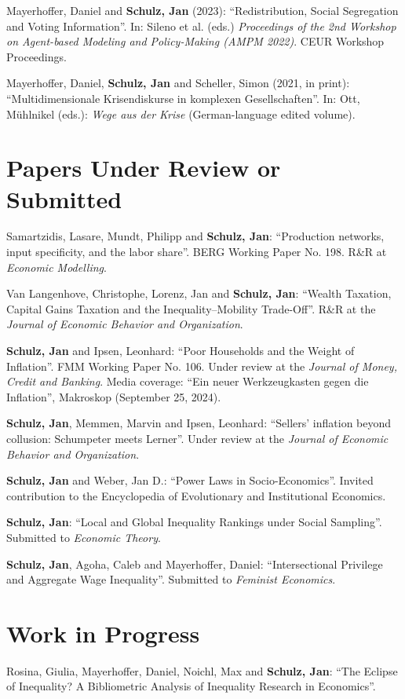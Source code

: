 \documentclass[margin]{res}
\begin{document}
\begin{resume}
	Mayerhoffer, Daniel and \textbf{Schulz, Jan} (2023): ``Redistribution, Social Segregation and Voting Information''. In: Sileno et al. (eds.) \textit{Proceedings of the 2nd Workshop on Agent-based Modeling and Policy-Making (AMPM 2022)}.  CEUR Workshop Proceedings.
	
	
	Mayerhoffer, Daniel, \textbf{Schulz, Jan} and Scheller, Simon (2021, in print): ``Multidimensionale Krisendiskurse in komplexen Gesellschaften''. In: Ott, M\"uhlnikel (eds.): \textit{Wege aus der Krise} (German-language edited volume).\\
	
	
	\section{Papers Under Review or Submitted} 
	Samartzidis, Lasare, Mundt, Philipp and \textbf{Schulz, Jan}: ``Production networks, input specificity, and the labor share''. BERG Working Paper No. 198. R\&R at \textit{Economic Modelling}.	
	
	Van Langenhove, Christophe, Lorenz, Jan and \textbf{Schulz, Jan}: ``Wealth Taxation, Capital Gains Taxation and the Inequality--Mobility Trade-Off''. R\&R at the \textit{Journal of Economic Behavior and Organization}.
	
	\textbf{Schulz, Jan} and Ipsen, Leonhard: ``Poor Households and the Weight of Inflation''. FMM Working Paper No. 106. Under review at the \textit{Journal of Money, Credit and Banking}.
	Media coverage: ``Ein neuer Werkzeugkasten gegen die Inflation'', Makroskop (September 25, 2024).
	
	\clearpage
	\textbf{Schulz, Jan}, Memmen, Marvin and Ipsen, Leonhard: ``Sellers' inflation beyond collusion: Schumpeter meets Lerner''. Under review at the \textit{Journal of Economic Behavior and Organization}.
	
	\textbf{Schulz, Jan} and Weber, Jan D.: ``Power Laws in Socio-Economics''. Invited contribution to the Encyclopedia of Evolutionary and Institutional Economics.
	
	\textbf{Schulz, Jan}: ``Local and Global Inequality Rankings under Social Sampling''. Submitted to \textit{Economic Theory}.
	
	\textbf{Schulz, Jan}, Agoha, Caleb and Mayerhoffer, Daniel: ``Intersectional Privilege and Aggregate Wage Inequality''.  Submitted to \textit{Feminist Economics}.
	\section{Work in Progress} 
	Rosina, Giulia, Mayerhoffer, Daniel, Noichl, Max and \textbf{Schulz, Jan}: ``The Eclipse of Inequality? A Bibliometric Analysis of Inequality Research in Economics''.
	

\end{resume}
\end{document}
